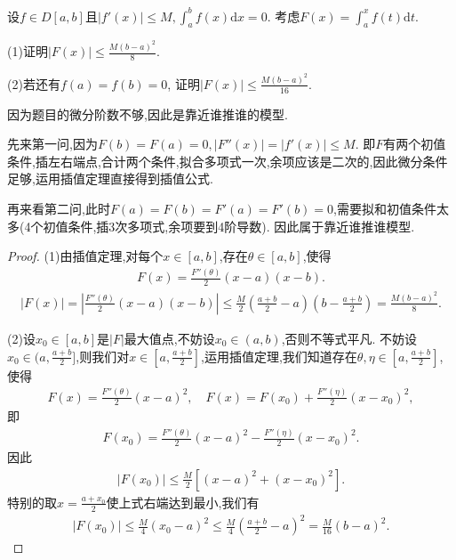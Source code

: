 \documentclass[../../main.tex]{subfiles}
\begin{document}
\begin{example}
设$f \in D[a,b]$且$|f'(x)| \leqslant M, \int_a^b f(x)\mathrm{d}x = 0$. 考虑$F(x) = \int_a^x f(t)\mathrm{d}t$. 

(1)证明$|F(x)| \leqslant \frac{M(b-a)^2}{8}$. 

(2)若还有$f(a) = f(b) = 0$, 证明$|F(x)| \leqslant \frac{M(b-a)^2}{16}$.
\end{example}
\begin{note}
因为题目的微分阶数不够,因此是靠近谁推谁的模型.

先来第一问,因为$F(b) = F(a) = 0, |F''(x)| = |f'(x)| \leqslant M$. 即$F$有两个初值条件,插左右端点,合计两个条件,拟合多项式一次,余项应该是二次的,因此微分条件足够,运用插值定理直接得到插值公式.

再来看第二问,此时$F(a) = F(b) = F'(a) = F'(b) = 0$,需要拟和初值条件太多(4个初值条件,插3次多项式,余项要到4阶导数). 因此属于靠近谁推谁模型.
\end{note}
\begin{proof}
(1)由插值定理,对每个$x \in [a,b]$,存在$\theta \in [a,b]$,使得
\begin{align*}
F(x) = \frac{F''(\theta)}{2}(x-a)(x-b).
\end{align*}
\begin{align*}
|F(x)| = \left| \frac{F''(\theta)}{2}(x-a)(x-b) \right| \leqslant \frac{M}{2} \left( \frac{a+b}{2} - a \right) \left( b - \frac{a+b}{2} \right) = \frac{M(b-a)^2}{8}.
\end{align*}

(2)设$x_0 \in [a,b]$是$|F|$最大值点,不妨设$x_0 \in (a,b)$,否则不等式平凡.
不妨设$x_0 \in (a, \frac{a+b}{2}]$,则我们对$x \in [a, \frac{a+b}{2}]$,运用插值定理,我们知道存在$\theta, \eta \in [a, \frac{a+b}{2}]$,使得
\begin{align*}
F(x) = \frac{F''(\theta)}{2}(x-a)^2, \quad F(x) = F(x_0) + \frac{F''(\eta)}{2}(x-x_0)^2,
\end{align*}
即
\begin{align*}
F(x_0) = \frac{F''(\theta)}{2}(x-a)^2 - \frac{F''(\eta)}{2}(x-x_0)^2.
\end{align*}
因此
\begin{align*}
|F(x_0)| \leqslant \frac{M}{2} \left[ (x-a)^2 + (x-x_0)^2 \right].
\end{align*}
特别的取$x = \frac{a+x_0}{2}$使上式右端达到最小,我们有
\begin{align*}
|F(x_0)| \leqslant \frac{M}{4}(x_0 - a)^2 \leqslant \frac{M}{4} \left( \frac{a+b}{2} - a \right)^2 = \frac{M}{16}(b-a)^2.
\end{align*}

\end{proof}
\end{document}
